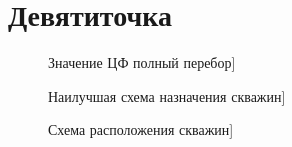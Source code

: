 \documentclass[14pt]{article}
\begin{document}
	\section{Девятиточка}
	\begin{figure}
		\caption{Значение ЦФ полный перебор]}
		\label{fig:map1}
	\end{figure}
	\begin{figure}
		\caption{Наилучшая схема назначения скважин]}
		\label{fig:map2}
	\end{figure}
	\begin{figure}
		\caption{Схема расположения скважин]}
		\label{fig:map3}
	\end{figure}
\end{document}
